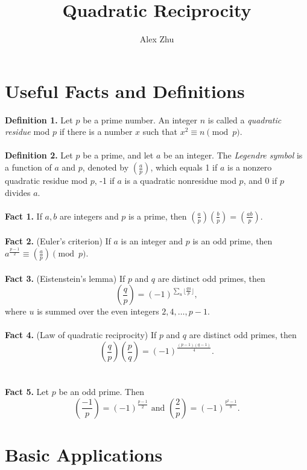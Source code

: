 \documentclass[11pt]{article}
\begin{document}
\title{Quadratic Reciprocity}
\author{Alex Zhu}

\maketitle

\section{Useful Facts and Definitions}

\textbf{Definition 1.} Let $p$ be a prime number. An integer $n$ is called a \emph{quadratic residue} mod $p$ if there is a number $x$ such that $x^2 \equiv n \pmod{p}$. 
\\\\
\textbf{Definition 2.} Let $p$ be a prime, and let $a$ be an integer. The \emph{Legendre symbol} is a function of $a$ and $p$, denoted by $\left( \frac{a}{p} \right)$, which equals 1 if $a$ is a nonzero quadratic residue mod $p$, -1 if $a$ is a quadratic nonresidue mod $p$, and 0 if $p$ divides $a$.
\\\\
\textbf{Fact 1.} If $a,b$ are integers and $p$ is a prime, then $\left( \frac{a}{p} \right) \left( \frac{b}{p} \right) = \left( \frac{ab}{p} \right)$. 
\\\\
\textbf{Fact 2.} (Euler's criterion) If $a$ is an integer and $p$ is an odd prime, then $a^{\frac{p-1}{2}} \equiv \left( \frac{a}{p} \right) \pmod{p}$. 
\\\\
\textbf{Fact 3.} (Eistenstein's lemma) If $p$ and $q$ are distinct odd primes, then \[ \left( \frac{q}{p} \right) = (-1)^{\sum_u \lfloor \frac{qu}{p} \rfloor}, \] where $u$ is summed over the even integers $2, 4, \ldots, p-1$. 
\\\\
\textbf{Fact 4.} (Law of quadratic reciprocity) If $p$ and $q$ are distinct odd primes, then \[ \left( \frac{q}{p} \right) \left( \frac{p}{q} \right) = (-1)^{\frac{(p-1)(q-1)}{4}}. \]
\\\\
\textbf{Fact 5.} Let $p$ be an odd prime. Then \[ \left( \frac{-1}{p} \right) = (-1)^{\frac{p-1}{2}} \mbox{ and } \left( \frac{2}{p} \right) = (-1)^{\frac{p^2-1}{8}}. \] 

\section{Basic Applications}
\end{document}
